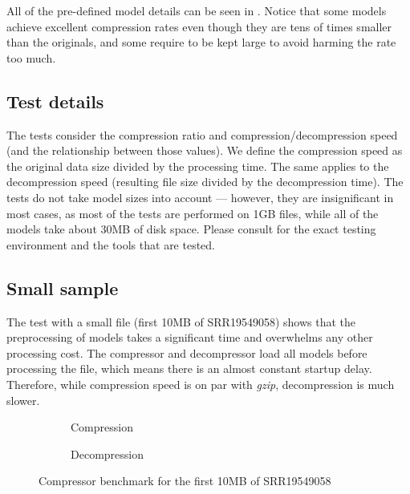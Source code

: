 All of the pre-defined model details can be seen in
.
Notice that some models achieve excellent compression rates even though they
are tens of times smaller than the originals, and some require to be kept
large to avoid harming the rate too much.

\subsection{Test details}\label{subsec:test-details}

The tests consider the compression ratio and compression/decompression speed
(and the relationship between those values).
We define the compression speed as the original data size divided by the
processing time.
The same applies to the decompression speed (resulting file size divided by
the decompression time).
The tests do not take model sizes into account --- however, they are
insignificant in most cases, as most of the tests are performed on 1GB files,
while all of the models take about 30MB of disk space.
Please consult  for the exact
testing environment and the tools that are tested.

\newpage

\subsection{Small sample}\label{subsec:small-data}

The test with a small file (first 10MB of SRR19549058) shows that the
preprocessing of models takes a significant time and overwhelms any other
processing cost.
The compressor and decompressor load all models before processing the file,
which means there is an almost constant startup delay.
Therefore, while compression speed is on par with \emph{gzip}, decompression
is much slower.

\begin{figure}[h]
    \begin{subfigure}{\textwidth}
        \centering
        
        \caption{Compression}
    \end{subfigure}
    \begin{subfigure}{\textwidth}
        \centering
        \vspace{1em}
        
        \caption{Decompression}
    \end{subfigure}
    \caption{%
        Compressor benchmark for the first 10MB of SRR19549058
    }
    \label{fig:bench-small-data}
\end{figure}

